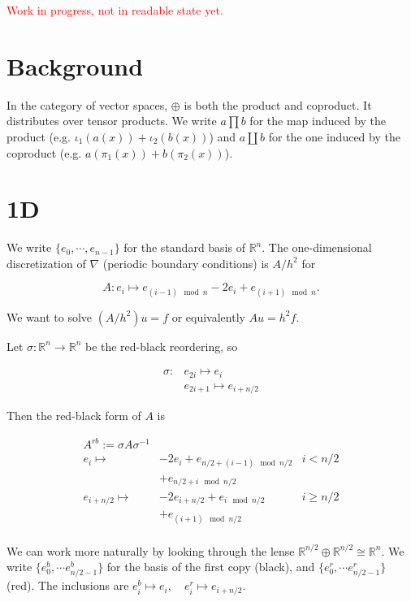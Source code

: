 \documentclass{article}
\begin{document}
\textcolor{red}{Work in progress, not in readable state yet.}

\section{Background}

In the category of vector spaces, $\oplus$ is both the product and coproduct.
It distributes over tensor products. We write $a \prod b$ for the map induced
by the product (e.g. $\iota_1(a(x)) + \iota_2(b(x))$) and $a \coprod b$ for the 
one induced by the coproduct (e.g. $a(\pi_1(x)) + b(\pi_2(x))$).

\section{1D}

We write $\{e_0, \cdots, e_{n - 1}\}$ for the standard basis of $\mathbb{R}^n$.
The one-dimensional discretization of $\nabla$ (periodic boundary conditions)
is $A / h^2$ for

\[
A: e_{i} \mapsto e_{(i - 1) \mod n} - 2 e_{i} + e_{(i + 1) \mod n}.
\]

We want to solve $(A / h^2)u = f$ or equivalently $Au = h^2 f$.

Let $\sigma: \mathbb{R}^n \to \mathbb{R}^n$ be the red-black reordering, so

\begin{align*}
    \sigma: & e_{2i} \mapsto e_{i} \\
            & e_{2i + 1} \mapsto e_{i + n / 2}
\end{align*}

Then the red-black form of $A$ is

\begin{align*}
    A^{rb} := \sigma A \sigma^{-1} & & \\
    e_{i} \mapsto & -2e_{i} + e_{n / 2 + (i - 1) \mod n / 2} & i < n / 2 \\
          & + e_{n / 2 + i \mod n / 2} &  \\ 
    e_{i + n / 2} \mapsto & -2e_{i + n / 2} + e_{i \mod n / 2} & i \geq n / 2 \\
          & + e_{(i + 1) \mod n / 2} &  \\ 
\end{align*}

We can work more naturally by looking through the lense 
$\mathbb{R}^{n / 2} \oplus \mathbb{R}^{n / 2} \cong \mathbb{R}^{n}$.
We write $\{e^b_0, \cdots e^b_{n / 2 - 1}\}$ for the basis of the first copy
(black), and $\{e^r_0, \cdots e^r_{n / 2 - 1}\}$ (red). The inclusions are
$e^b_i \mapsto e_i, \quad e^r_i \mapsto e_{i + n / 2}$.
\end{document}
